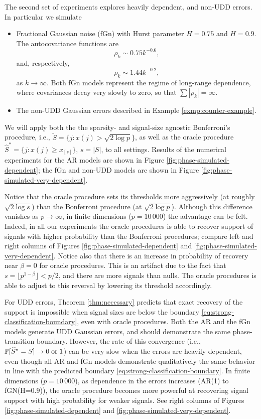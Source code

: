 The second set of experiments explores heavily dependent, and non-UDD errors.
In particular we simulate
\begin{itemize}
    \item Fractional Gaussian noise (fGn) with Hurst parameter $H = 0.75$ and $H = 0.9$. 
    The autocovariance functions are 
    $$\rho_{k} \sim 0.75k^{-0.6},$$
    and, respectively,
    $$\rho_{k} \sim 1.44k^{-0.2},$$
    as $k\to\infty$.
    Both fGn models represent the regime of long-range dependence, where covariances decay very slowly to zero, so that $\sum|\rho_k| = \infty$.
    \item The non-UDD Gaussian errors described in Example \ref{exmp:counter-example}.
\end{itemize}
We will apply both the the sparsity- and signal-size agnostic Bonferroni's procedure, i.e., $\widetilde{S} = \{j:x(j)>\sqrt{2\log{p}}\}$, as well as the oracle procedure $\widehat{S}^* = \{j:x(j)\ge x_{[s]}\}$, $s=|S|$, to all settings.
Results of the numerical experiments for the AR models are shown in Figure \ref{fig:phase-simulated-dependent}; the fGn and non-UDD models are shown in Figure \ref{fig:phase-simulated-very-dependent}.

Notice that the oracle procedure sets its thresholds more aggressively (at roughly $\sqrt{2\log s}$) than the Bonferroni procedure (at $\sqrt{2\log p}$).
Although this difference vanishes as $p\to\infty$, in finite dimensions ($p=10\,000$) the advantage can be felt. 
Indeed, in all our experiments the oracle procedures is able to recover support of signals with higher probability than the Bonferroni procedures; compare left and right columns of Figures \ref{fig:phase-simulated-dependent} and \ref{fig:phase-simulated-very-dependent}.
Notice also that there is an increase in probability of recovery near $\beta=0$ for oracle procedures.
This is an artifact due to the fact that $s = \lfloor p^{1-\beta}\rfloor < p/2$, and there are more signals than nulls. The oracle procedures is able to adjust to this reversal by lowering its threshold accordingly.

For UDD errors, Theorem \ref{thm:necessary} predicts that exact recovery of the support is impossible when signal sizes are below the boundary \eqref{eq:strong-classification-boundary}, even with oracle procedures. 
Both the AR and the fGn models generate UDD Gaussian errors, and should demonstrate the same phase-transition boundary.
However, the rate of this convergence (i.e., $\P[\widehat{S}^*=S]\to0\;\text{or}\;1$) can be very slow when the errors are heavily dependent,
even though all AR and fGn models demonstrate qualitatively the same behavior in line with the predicted boundary \eqref{eq:strong-classification-boundary}. 
In finite dimensions ($p=10\,000$), as dependence in the errors increases (AR(1) to fGN(H=0.9)), the oracle procedure becomes more powerful at recovering signal support with high probability for weaker signals. 
See right columns of Figures \ref{fig:phase-simulated-dependent} and \ref{fig:phase-simulated-very-dependent}.

